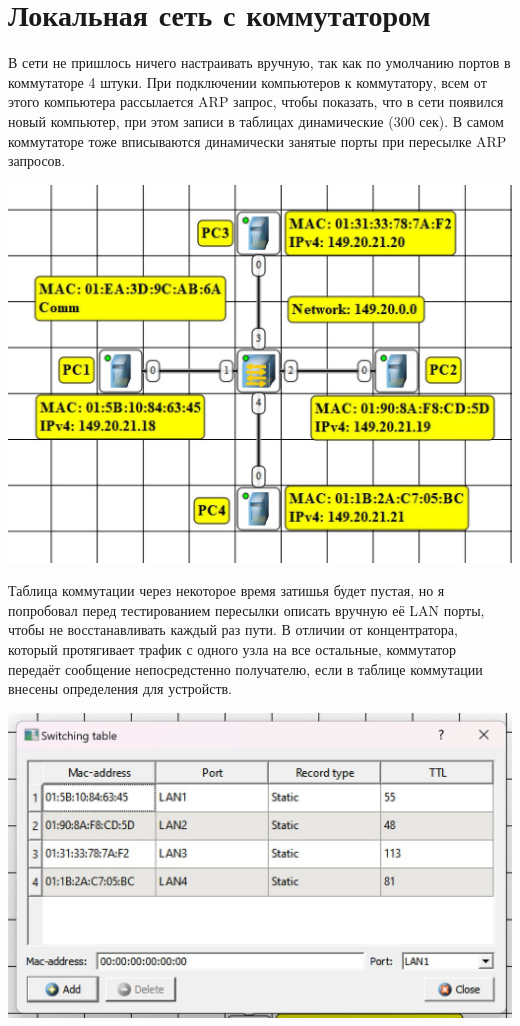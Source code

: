 \documentclass{article}
\begin{document}
\section{Локальная сеть с коммутатором}
В сети не пришлось ничего настраивать вручную, так как по умолчанию портов в коммутаторе 4 штуки.
При подключении компьютеров к коммутатору, всем от этого компьютера рассылается ARP запрос, чтобы показать, что в сети появился новый компьютер, при этом записи в таблицах динамические (300 сек).
В самом коммутаторе тоже вписываются динамически занятые порты при пересылке ARP запросов.
\begin{center}
    \includegraphics[width=.8\textwidth]{com1.jpg}
\end{center}
Таблица коммутации через некоторое время затишья будет пустая, но я попробовал перед тестированием пересылки описать вручную её LAN порты, чтобы не восстанавливать каждый раз пути.
В отличии от концентратора, который протягивает трафик с одного узла на все остальные, коммутатор передаёт сообщение непосредстенно получателю, если в таблице коммутации внесены определения для устройств.
\begin{center}
    \includegraphics[width=.8\textwidth]{com2.jpg}
\end{center}
\end{document}
